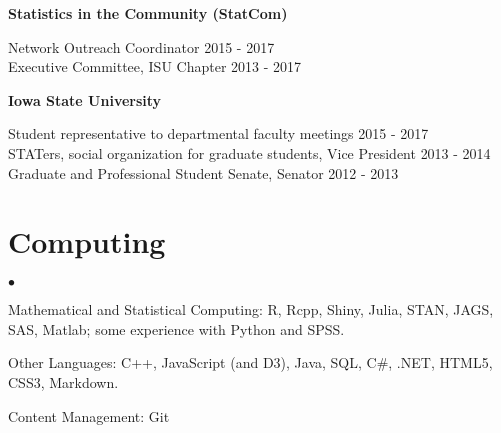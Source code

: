 \documentclass[margin,line]{res}
\newenvironment{list2}{
  \begin{list}{$\bullet$}{%
      \setlength{\itemsep}{0in}
      \setlength{\parsep}{0in} \setlength{\parskip}{0in}
      \setlength{\topsep}{0in} \setlength{\partopsep}{0in}
      \setlength{\leftmargin}{0.2in}}}{\end{list}}
\begin{document}
\begin{resume}
{\bf Statistics in the Community (StatCom)}

\vspace{-.3cm}
Network Outreach Coordinator \hfill {2015 - 2017}\\
Executive Committee, ISU Chapter \hfill {2013 - 2017}

{\bf Iowa State University}

\vspace{-.3cm}
Student representative to departmental faculty meetings \hfill {2015 - 2017}\\
STATers, social organization for graduate students, Vice President \hfill {2013 - 2014}\\
Graduate and Professional Student Senate, Senator \hfill {2012 - 2013}



\section{\sc Computing}
\begin{list2}
\item Mathematical and Statistical Computing:  R, Rcpp, Shiny, Julia, STAN, JAGS, SAS, Matlab; some experience  with Python and SPSS.
\item Other Languages: C++, JavaScript (and D3), Java, SQL, C\#, .NET, HTML5, CSS3, Markdown.
\item Content Management: Git
\end{list2}











\end{resume}
\end{document}
